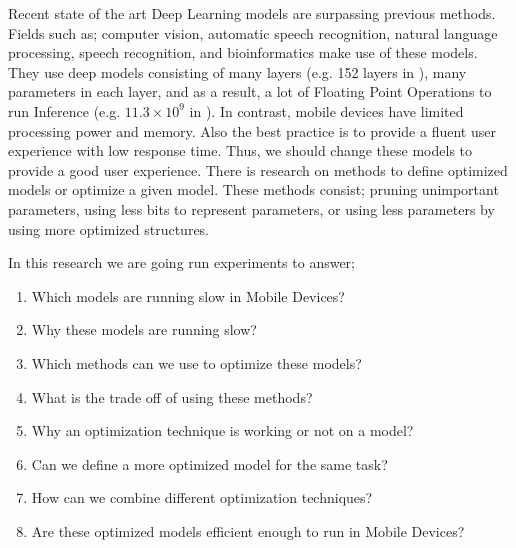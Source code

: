 Recent state of the art Deep Learning models are surpassing previous methods. Fields such as; computer vision, automatic speech recognition, natural language processing, speech recognition, and bioinformatics make use of these models. They use deep models consisting of many layers (e.g. 152 layers in  \cite{He:2015aa}), many parameters in each layer, and as a result, a lot of Floating Point Operations to run Inference (e.g. $11.3 \times 10^9$ in  \cite{He:2015aa}).
In contrast, mobile devices have limited processing power and memory. Also the best practice is to provide a fluent user experience with low response time. Thus, we should change these models to provide a good user experience.
There is research on methods to define optimized models or optimize a given model. These methods consist; pruning unimportant parameters, using less bits to represent parameters, or using less parameters by using more optimized structures. 

In this research we are going run experiments to answer;
\begin{enumerate}
\item    Which models are running slow in Mobile Devices?
\item    Why these models are running slow?
\item    Which methods can we use to optimize these models?
\item    What is the trade off of using these methods?
\item    Why an optimization technique is working or not on a model?
\item    Can we define a more optimized model for the same task?
\item    How can we combine different optimization techniques?
\item    Are these optimized models efficient enough to run in Mobile Devices? 
\end{enumerate}


